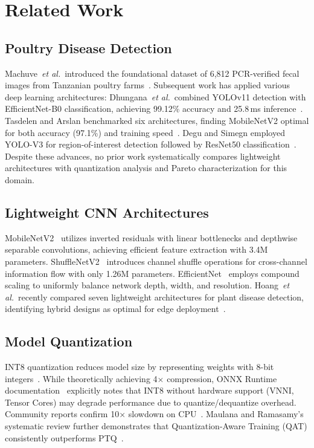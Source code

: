 \documentclass[conference,a4paper]{IEEEtran}
\begin{document}
\section{Related Work}

\subsection{Poultry Disease Detection}
Machuve~\textit{et al.}~introduced the foundational dataset of 6,812 PCR-verified fecal images from Tanzanian poultry farms~\cite{machuve2022}. Subsequent work has applied various deep learning architectures: Dhungana~\textit{et al.}~combined YOLOv11 detection with EfficientNet-B0 classification, achieving 99.12\% accuracy and 25.8\,ms inference~\cite{dhungana2025}. Tasdelen and Arslan benchmarked six architectures, finding MobileNetV2 optimal for both accuracy (97.1\%) and training speed~\cite{tasdelen2025}. Degu and Simegn employed YOLO-V3 for region-of-interest detection followed by ResNet50 classification~\cite{degu2023}. Despite these advances, no prior work systematically compares lightweight architectures with quantization analysis and Pareto characterization for this domain.

\subsection{Lightweight CNN Architectures}
MobileNetV2~\cite{mobilenetv2} utilizes inverted residuals with linear bottlenecks and depthwise separable convolutions, achieving efficient feature extraction with 3.4M parameters. ShuffleNetV2~\cite{shufflenetv2} introduces channel shuffle operations for cross-channel information flow with only 1.26M parameters. EfficientNet~\cite{efficientnet} employs compound scaling to uniformly balance network depth, width, and resolution. Hoang~\textit{et al.}~recently compared seven lightweight architectures for plant disease detection, identifying hybrid designs as optimal for edge deployment~\cite{hoang2026}.

\subsection{Model Quantization}
INT8 quantization reduces model size by representing weights with 8-bit integers~\cite{jacob2018}. While theoretically achieving 4$\times$ compression, ONNX Runtime documentation~\cite{onnxruntime2024} explicitly notes that INT8 without hardware support (VNNI, Tensor Cores) may degrade performance due to quantize/dequantize overhead. Community reports confirm 10$\times$ slowdown on CPU~\cite{onnxruntime12854, onnxruntime6732}. Maulana and Ramasamy's systematic review further demonstrates that Quantization-Aware Training (QAT) consistently outperforms PTQ~\cite{maulana2026}.
\end{document}

